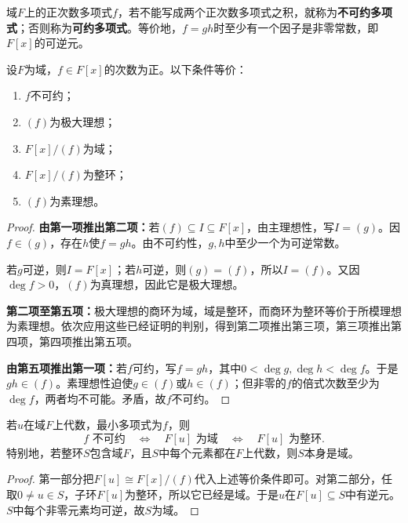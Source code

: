\begin{definition}
域$F$上的正次数多项式$f$，若不能写成两个正次数多项式之积，就称为\textbf{不可约多项式}；否则称为\textbf{可约多项式}。等价地，$f=gh$时至少有一个因子是非零常数，即$F[x]$的可逆元。
\end{definition}

\begin{theorem}\label{p2:irreducible-maximal}
设$F$为域，$f\in F[x]$的次数为正。以下条件等价：
\begin{enumerate}
\item $f$不可约；
\item $(f)$为极大理想；
\item $F[x]/(f)$为域；
\item $F[x]/(f)$为整环；
\item $(f)$为素理想。
\end{enumerate}
\end{theorem}
\begin{proof}
\textbf{由第一项推出第二项：}若$(f)\subseteq I\subseteq F[x]$，由主理想性，写$I=(g)$。因$f\in(g)$，存在$h$使$f=gh$。由不可约性，$g,h$中至少一个为可逆常数。

若$g$可逆，则$I=F[x]$；若$h$可逆，则$(g)=(f)$，所以$I=(f)$。又因$\deg f>0$，$(f)$为真理想，因此它是极大理想。

\textbf{第二项至第五项：}极大理想的商环为域，域是整环，而商环为整环等价于所模理想为素理想。依次应用这些已经证明的判别，得到第二项推出第三项，第三项推出第四项，第四项推出第五项。

\textbf{由第五项推出第一项：}若$f$可约，写$f=gh$，其中$0<\deg g,\deg h<\deg f$。于是$gh\in(f)$。素理想性迫使$g\in(f)$或$h\in(f)$；但非零的$f$的倍式次数至少为$\deg f$，两者均不可能。矛盾，故$f$不可约。
\end{proof}

\begin{corollary}
若$u$在域$F$上代数，最小多项式为$f$，则
\[
f\text{ 不可约}\quad\Longleftrightarrow\quad F[u]\text{ 为域}
\quad\Longleftrightarrow\quad F[u]\text{ 为整环}.
\]
特别地，若整环$S$包含域$F$，且$S$中每个元素都在$F$上代数，则$S$本身是域。
\end{corollary}
\begin{proof}
第一部分把$F[u]\cong F[x]/(f)$代入上述等价条件即可。对第二部分，任取$0\ne u\in S$，子环$F[u]$为整环，所以它已经是域。于是$u$在$F[u]\subseteq S$中有逆元。$S$中每个非零元素均可逆，故$S$为域。
\end{proof}

